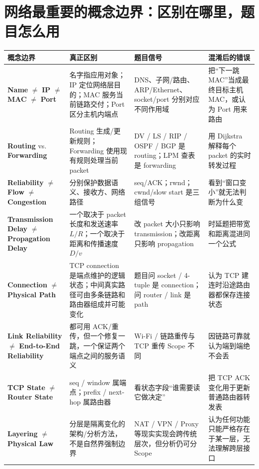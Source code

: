 \documentclass[11pt,a4paper,openany]{ctexbook}
\newcommand{\key}[1]{\textbf{\color{deep}#1}}
\begin{document}
\section{网络最重要的概念边界：区别在哪里，题目怎么用}
\begin{longtable}{L{3.6cm}L{4.3cm}L{4.0cm}L{\dimexpr\linewidth-13.17cm\relax}}
\toprule
\textbf{概念边界} & \textbf{真正区别} & \textbf{题目信号} & \textbf{混淆后的错误}\\
\midrule
\key{Name} $\neq$ \key{IP} $\neq$ \key{MAC} $\neq$ \key{Port} & 名字指应用对象；IP 定位网络层目的；MAC 服务当前链路交付；Port 区分主机内端点 & DNS、子网/路由、ARP/Ethernet、socket/port 分别对应不同作用域 & 把“下一跳 MAC”当成最终目标主机 MAC，或认为 Port 用来路由 \\
\midrule
\key{Routing} vs. \key{Forwarding} & Routing 生成/更新规则；Forwarding 使用现有规则处理当前 packet & DV / LS / RIP / OSPF / BGP 是 routing；LPM 查表是 forwarding & 用 Dijkstra 解释每个 packet 的实时转发过程 \\
\midrule
\key{Reliability} $\neq$ \key{Flow} $\neq$ \key{Congestion} & 分别保护数据语义、接收方、网络路径 & seq/ACK；rwnd；cwnd/slow start 是三组信号 & 看到“窗口变小”就无法判断为什么变 \\
\midrule
\key{Transmission Delay} $\neq$ \key{Propagation Delay} & 一个取决于 packet 长度和发送速率 $L/R$；一个取决于距离和传播速度 $D/v$ & 改 packet 大小只影响 transmission；改距离只影响 propagation & 时延题把带宽和距离混进同一个公式 \\
\midrule
\key{Connection} $\neq$ \key{Physical Path} & TCP connection 是端点维护的逻辑状态；中间真实路径可由多条链路和路由器组成并可能变化 & 题目问 socket / 4-tuple 是 connection；问 router / link 是 path & 认为 TCP 建连时沿途路由器都保存连接状态 \\
\midrule
\key{Link Reliability} $\neq$ \key{End-to-End Reliability} & 都可用 ACK/重传，但一个修复一跳，一个保证两个端点之间的服务语义 & Wi-Fi / 链路重传与 TCP 重传 Scope 不同 & 因链路可靠就认为端到端绝不会丢 \\
\midrule
\key{TCP State} $\neq$ \key{Router State} & seq / window 属端点；prefix / next-hop 属路由器 & 看状态字段“谁需要读它做决定” & 把 TCP ACK 变化用于更新普通路由器转发表 \\
\midrule
\key{Layering} $\neq$ \key{Physical Law} & 分层是隔离变化的架构/分析方法，不是自然界强制边界 & NAT / VPN / Proxy 等现实实现会跨传统层次，但分析仍可分 Scope & 认为任何功能只能严格存在于某一层，无法理解跨层接口 \\
\bottomrule
\end{longtable}
\end{document}
